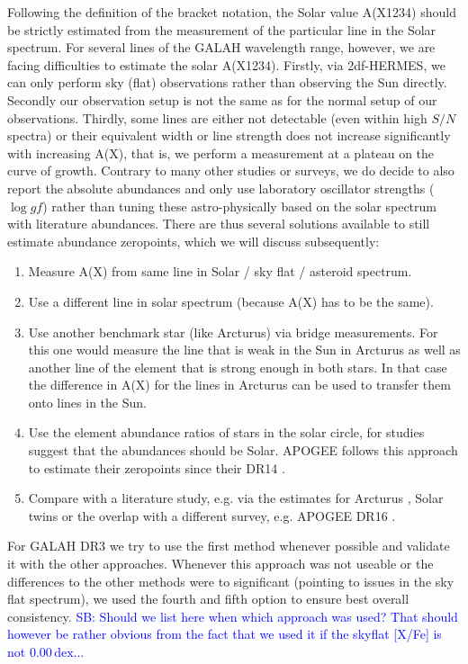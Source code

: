 \documentclass[fleqn,usenatbib,useAMS]{mnras}
\newcommand\SB[1]{\textcolor{blue}{SB: #1}}
\begin{document}
Following the definition of the bracket notation, the Solar value A(X1234) should be strictly estimated from the measurement of the particular line in the Solar spectrum. For several lines of the GALAH wavelength range, however, we are facing difficulties to estimate the solar A(X1234). Firstly, via 2df-HERMES, we can only perform sky (flat) observations rather than observing the Sun directly. Secondly our observation setup is not the same as for the normal setup of our observations. Thirdly, some lines are either not detectable (even within high $S/N$ spectra) or their equivalent width or line strength does not increase significantly with increasing A(X), that is, we perform a measurement at a plateau on the curve of growth. Contrary to many other studies or surveys, we do decide to also report the absolute abundances and only use laboratory oscillator strengths ($\log gf$) rather than tuning these astro-physically based on the solar spectrum with literature abundances. There are thus several solutions available to still estimate abundance zeropoints, which we will discuss subsequently:
\begin{enumerate}
\item Measure A(X) from same line in Solar / sky flat / asteroid spectrum.
\item Use a different line in solar spectrum (because A(X) has to be the same).
\item Use another benchmark star (like Arcturus) via bridge measurements. For this one would measure the line that is weak in the Sun in Arcturus as well as another line of the element that is strong enough in both stars. In that case the difference in A(X) for the lines in Arcturus can be used to transfer them onto lines in the Sun.
\item Use the element abundance ratios of stars in the solar circle, for studies suggest that the abundances should be Solar. APOGEE follows this approach to estimate their zeropoints since their DR14 \citep[see][]{Holtzman2018, SDSSDR16}.
\item Compare with a literature study, e.g. via the estimates for Arcturus \citep[e.g.][]{Ramirez2011}, Solar twins \citep[e.g.][]{Bedell2018} or the overlap with a different survey, e.g. APOGEE DR16 \citep{SDSSDR16}.
\end{enumerate}

For GALAH DR3 we try to use the first method whenever possible and validate it with the other approaches. Whenever this approach was not useable or the differences to the other methods were to significant (pointing to issues in the sky flat spectrum), we used the fourth and fifth option to ensure best overall consistency. \SB{Should we list here when which approach was used? That should however be rather obvious from the fact that we used it if the skyflat [X/Fe] is not $0.00\,\mathrm{dex}$...}
\end{document}
